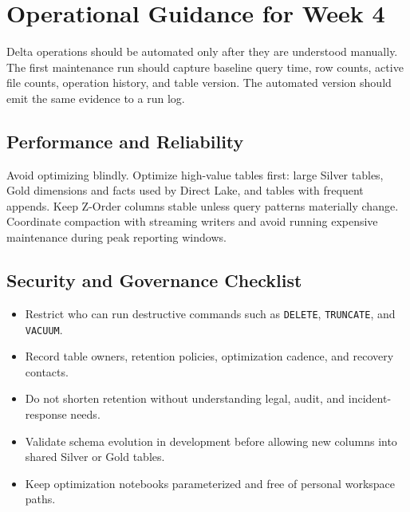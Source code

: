 \section{Operational Guidance for Week 4}
Delta operations should be automated only after they are understood manually. The first maintenance run should capture baseline query time, row counts, active file counts, operation history, and table version. The automated version should emit the same evidence to a run log.

\subsection{Performance and Reliability}
Avoid optimizing blindly. Optimize high-value tables first: large Silver tables, Gold dimensions and facts used by Direct Lake, and tables with frequent appends. Keep Z-Order columns stable unless query patterns materially change. Coordinate compaction with streaming writers and avoid running expensive maintenance during peak reporting windows.

\subsection{Security and Governance Checklist}
\begin{itemize}
    \item Restrict who can run destructive commands such as \texttt{DELETE}, \texttt{TRUNCATE}, and \texttt{VACUUM}.
    \item Record table owners, retention policies, optimization cadence, and recovery contacts.
    \item Do not shorten retention without understanding legal, audit, and incident-response needs.
    \item Validate schema evolution in development before allowing new columns into shared Silver or Gold tables.
    \item Keep optimization notebooks parameterized and free of personal workspace paths.
\end{itemize}

